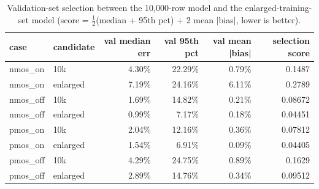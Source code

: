 \begin{table}[H]
\centering
{\small
\begin{tabular}{llrrrr}
\toprule
case & candidate & val median err & val 95th pct & val mean |bias| & selection score \\
\midrule
nmos\_on & 10k & 4.30\% & 22.29\% & 0.79\% & 0.1487 \\
nmos\_on & enlarged & 7.19\% & 24.16\% & 6.11\% & 0.2789 \\
nmos\_off & 10k & 1.69\% & 14.82\% & 0.21\% & 0.08672 \\
nmos\_off & enlarged & 0.99\% & 7.17\% & 0.18\% & 0.04451 \\
pmos\_on & 10k & 2.04\% & 12.16\% & 0.36\% & 0.07812 \\
pmos\_on & enlarged & 1.54\% & 6.91\% & 0.09\% & 0.04405 \\
pmos\_off & 10k & 4.29\% & 24.75\% & 0.89\% & 0.1629 \\
pmos\_off & enlarged & 2.89\% & 14.76\% & 0.34\% & 0.09512 \\
\bottomrule
\end{tabular}
}
\caption{Validation-set selection between the 10,000-row model and the enlarged-training-set model (score = $\frac{1}{2}$(median + 95th pct) + 2 mean $|$bias$|$, lower is better).}
\label{tab:selection}
\end{table}

